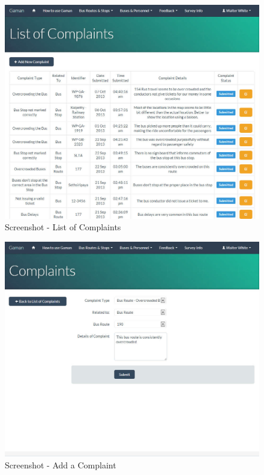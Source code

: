 \documentclass[12pt, oneside]{report}
\begin{document}
\begin {figure} [h!]
\centering
\includegraphics[scale=0.2]{listComplaints}
\caption [Screenshot - List of Complaints] {Screenshot - List of Complaints}
\label {image-listComplaints}
\end {figure}

\begin {figure} [h!]
\centering
\includegraphics[scale=0.2]{addComplaint}
\caption [Screenshot - Add a Complaint] {Screenshot - Add a Complaint}
\label {image-addComplaint}
\end {figure}
\end{document}
